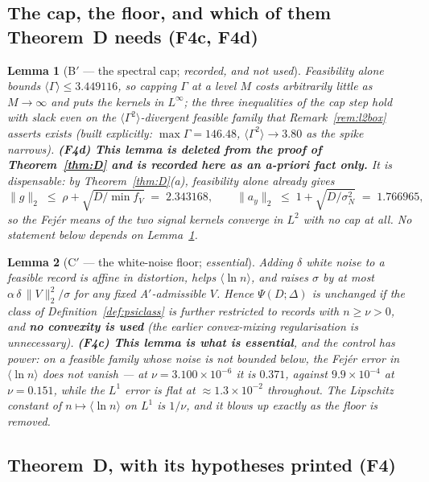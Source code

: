 \documentclass[11pt]{article}
\newtheorem{lemma}{Lemma}
\theoremstyle{definition}
\theoremstyle{remark}
\begin{document}
\subsection{The cap, the floor, and which of them Theorem~D needs (F4c, F4d)}

\begin{lemma}[B$'$ --- the spectral cap; \emph{recorded, and not used}]
\label{lem:Bprime}
Feasibility alone bounds $\langle\Gamma\rangle\le3.449116$, so capping
$\Gamma$ at a level $M$ costs arbitrarily little as $M\to\infty$ and puts the
kernels in $L^\infty$; the three inequalities of the cap step hold with slack
even on the $\langle\Gamma^2\rangle$-divergent feasible family that
Remark~\ref{rem:l2box} asserts exists (built explicitly: $\max\Gamma=146.48$,
$\langle\Gamma^2\rangle\to3.80$ as the spike narrows).
\textbf{(F4d) This lemma is deleted from the proof of Theorem~\ref{thm:D} and
is recorded here as an a-priori fact only.} It is \emph{dispensable}: by
Theorem~\ref{thm:D}(a), feasibility \emph{alone} already gives
\[
\|g\|_2\;\le\;\rho+\sqrt{D/\min f_V}\;=\;2.343168,
\qquad
\|a_y\|_2\;\le\;1+\sqrt{D/\sigma_N^2}\;=\;1.766965,
\]
so the Fej\'er means of the two signal kernels converge in $L^2$ \emph{with no
cap at all}. No statement below depends on Lemma~\ref{lem:Bprime}.
\end{lemma}

\begin{lemma}[C$'$ --- the white-noise floor; \emph{essential}]
\label{lem:Cprime}
Adding $\delta$ white noise to a feasible record is \emph{affine} in
distortion, \emph{helps} $\langle\ln n\rangle$, and raises $\sigma$ by at most
$\alpha\,\delta\,\|V\|_2^2/\sigma$ for any fixed A$'$-admissible $V$. Hence
$\Psi(D;\Delta)$ is unchanged if the class of
Definition~\ref{def:psiclass} is further restricted to records with
$n\ge\nu>0$, and \textbf{no convexity is used} (the earlier convex-mixing
regularisation is unnecessary).
\textbf{(F4c) This lemma is what is essential}, and the control has power:
on a feasible family whose noise is \emph{not} bounded below, the Fej\'er
error in $\langle\ln n\rangle$ does \emph{not} vanish --- at
$\nu=3.100\times10^{-6}$ it is $0.371$, against $9.9\times10^{-4}$ at
$\nu=0.151$, while the $L^1$ error is flat at $\approx1.3\times10^{-2}$
throughout. The Lipschitz constant of $n\mapsto\langle\ln n\rangle$ on $L^1$
is $1/\nu$, and it blows up exactly as the floor is removed.
\end{lemma}

\subsection{Theorem~D, with its hypotheses printed (F4)}
\end{document}
